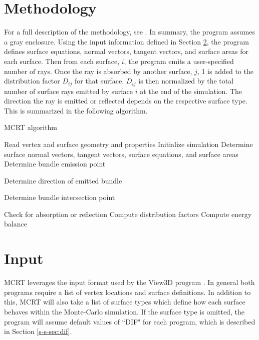 \documentclass{article}
\begin{document}
\section{Methodology}
\label{sec:method}

For a full description of the methodology, see \citep{Nigusse2004}. In summary, the program assumes a gray enclosure. Using the input information defined in Section \ref{sec:input}, the program defines surface equations, normal vectors, tangent vectors, and surface areas for each surface. Then from each surface, $i$, the program emits a user-specified number of rays. Once the ray is absorbed by another surface, $j$, 1 is added to the distribution factor $D_{ij}$ for that surface. $D_{ij}$ is then normalized by the total number of surface rays emitted by surface $i$ at the end of the simulation. The direction the ray is emitted or reflected depends on the respective surface type. This is summarized in the following algorithm.

\begin{algorithm}
\caption{MCRT algorithm}
\begin{algorithmic}[1]
\State Read vertex and surface geometry and properties
\State Initialize simulation
\State Determine surface normal vectors, tangent vectors, surface equations, and surface areas
\State Determine bundle emission point

\State Determine direction of emitted bundle

\State Determine bundle intersection point

\State Check for absorption or reflection
\EndFor
\EndFor
\State Compute distribution factors
\State Compute energy balance
\EndProcedure
\end{algorithmic}
\end{algorithm}

\section{Input}
\label{sec:input}

MCRT leverages the input format used by the View3D program \citep{Walton2002}. In general both  programs require a list of vertex locations and surface definitions. In addition to this, MCRT will also take a list of surface types which define how each surface behaves within the Monte-Carlo simulation. If the surface type is omitted, the program will assume default values of ``DIF" for each program, which is described in Section \ref{s-s-sec:dif}.
\end{document}
